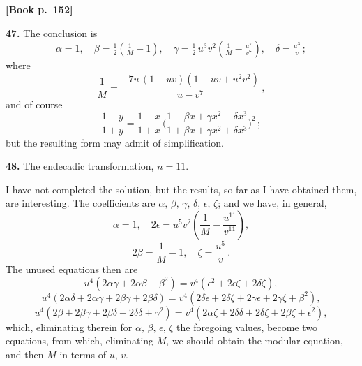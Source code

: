 \documentclass[11pt]{article}
\begin{document}
\bigskip

\noindent\textbf{[Book p.~152]}

\medskip

\textbf{47.} The conclusion is
\[
\alpha = 1,\quad \beta = \tfrac{1}{2}\!\left(\tfrac{1}{M} - 1\right),\quad
\gamma = \tfrac{1}{2}\,u^3 v^2\!\left(\tfrac{1}{M} - \tfrac{u^7}{v^7}\right),\quad
\delta = \tfrac{u^3}{v}\,;
\]
where
\[
\frac{1}{M} = \frac{-7u\,(1 - uv)(1 - uv + u^2 v^2)}{u - v^7}\,,
\]
and of course
\[
\frac{1-y}{1+y} = \frac{1-x}{1+x}\,\biggl(\frac{1 - \beta x + \gamma x^2 - \delta x^3}{1 + \beta x + \gamma x^2 + \delta x^3}\biggr)^{\!2}\,;
\]
but the resulting form may admit of simplification.

\medskip

\textbf{48.} The endecadic transformation, $n=11$.

I have not completed the solution, but the results, so far as I have obtained
them, are interesting. The coefficients are $\alpha,\,\beta,\,\gamma,\,\delta,\,\epsilon,\,\zeta$;
and we have, in general,
\[
\alpha = 1,\quad 2\epsilon = u^5 v^2\!\left(\frac{1}{M} - \frac{u^{11}}{v^{11}}\right),
\]
\[
2\beta = \frac{1}{M} - 1,\quad \zeta = \frac{u^5}{v}\,.
\]
The unused equations then are
\[
u^4(2\alpha\gamma + 2\alpha\beta + \beta^2) = v^4(\epsilon^2 + 2\epsilon\zeta + 2\delta\zeta),
\]
\[
u^4(2\alpha\delta + 2\alpha\gamma + 2\beta\gamma + 2\beta\delta) = v^4(2\delta\epsilon + 2\delta\zeta + 2\gamma\epsilon + 2\gamma\zeta + \beta^2),
\]
\[
u^4(2\beta + 2\beta\gamma + 2\beta\delta + 2\delta\delta + \gamma^2) = v^4(2\alpha\zeta + 2\delta\delta + 2\delta\zeta + 2\beta\zeta + \epsilon^2),
\]
which, eliminating therein for $\alpha,\,\beta,\,\epsilon,\,\zeta$ the foregoing values, become two equations,
from which, eliminating $M$, we should obtain the modular equation, and then $M$ in
terms of $u,\,v$.

\medskip
\end{document}

